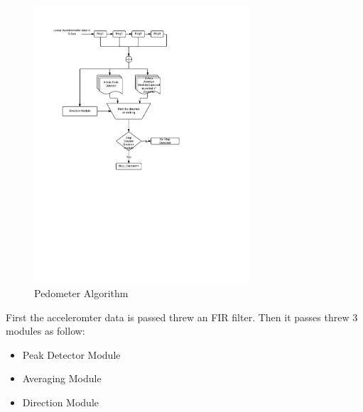\documentclass[conference]{IEEEtran}
\begin{document}
\begin{figure}[H]
\centering
\includegraphics[width=8cm]{PedometerAlg.pdf}
\caption{\scriptsize  Pedometer Algorithm}
\label{PedAlg}
\end{figure}

First the acceleromter data is passed threw an FIR filter. Then it passes threw 3 modules as follow:
\begin{itemize}
  \item Peak Detector Module
  \item Averaging Module
  \item Direction Module
\end{itemize}
\end{document}
